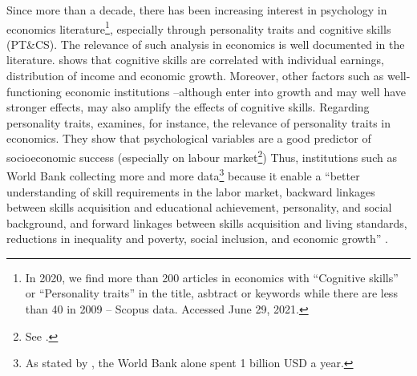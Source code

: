 \documentclass[a4paper, 11pt, onecolumn]{article}
\begin{document}
Since more than a decade, there has been increasing interest in psychology in economics literature\footnote{In 2020, we find more than 200 articles in economics with ``Cognitive skills'' or ``Personality traits'' in the title, asbtract or keywords while there are less than 40 in 2009 -- Scopus data. Accessed June 29, 2021.}, especially through personality traits and cognitive skills (PT\&CS).
The relevance of such analysis in economics is well documented in the literature.
\cite{Hanushek2008} shows that cognitive skills are correlated with individual earnings, distribution of income and economic growth.
Moreover, other factors such as well-functioning economic institutions --although enter into growth and may well have stronger effects, may also amplify the effects of cognitive skills.
Regarding personality traits, \cite{Borghans2008} examines, for instance, the relevance of personality traits in economics.
They show that psychological variables are a good predictor of socioeconomic success (especially on labour market\footnote{See \cite{Almlund2011}.}) 
Thus, institutions such as World Bank collecting more and more data\footnote{As stated by \cite{Laajaj2019b}, the World Bank alone spent 1 billion USD a year.} because it enable a ``better understanding of skill requirements in the labor market, backward linkages between skills acquisition and educational achievement, personality, and social background, and forward linkages between skills acquisition and living standards, reductions in inequality and poverty, social inclusion, and economic growth'' \citep{STEP2014}.
\end{document}
